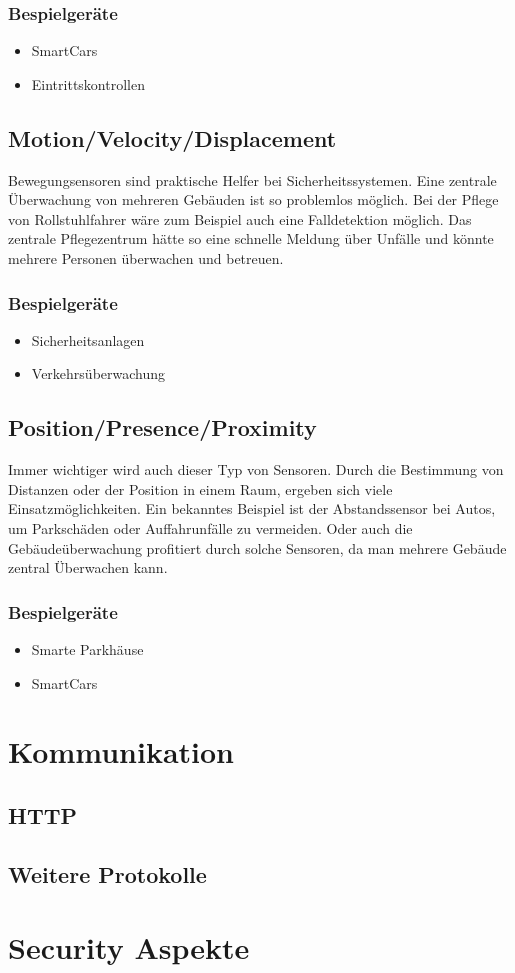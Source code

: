 \subsubsection{Bespielgeräte}
\begin{itemize}
\item	SmartCars
\item	Eintrittskontrollen
\end{itemize}


\subsection{Motion/Velocity/Displacement}%
Bewegungsensoren sind praktische Helfer bei Sicherheitssystemen. Eine zentrale Überwachung von mehreren Gebäuden ist so problemlos möglich. Bei der Pflege von Rollstuhlfahrer wäre zum Beispiel auch eine Falldetektion möglich. Das zentrale Pflegezentrum hätte so eine schnelle Meldung über Unfälle und könnte mehrere Personen überwachen und betreuen.
\subsubsection{Bespielgeräte}
\begin{itemize}
\item	Sicherheitsanlagen
\item	Verkehrsüberwachung
\end{itemize}


\subsection{Position/Presence/Proximity}%
Immer wichtiger wird auch dieser Typ von Sensoren. Durch die Bestimmung von Distanzen oder der Position in einem Raum, ergeben sich viele Einsatzmöglichkeiten. Ein bekanntes Beispiel ist der Abstandssensor bei Autos, um Parkschäden oder Auffahrunfälle zu vermeiden. Oder auch die Gebäudeüberwachung profitiert durch solche Sensoren, da man mehrere Gebäude zentral Überwachen kann.
\subsubsection{Bespielgeräte}
\begin{itemize}
\item	Smarte Parkhäuse
\item	SmartCars
\end{itemize}


\section{Kommunikation}
\subsection{HTTP}
\subsection{Weitere Protokolle}
\section{Security Aspekte}

